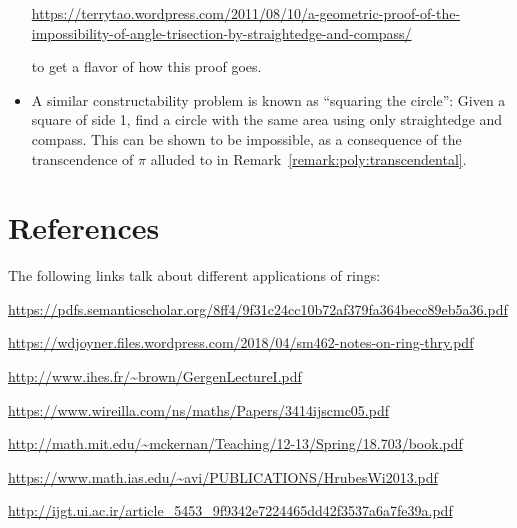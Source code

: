 \begin{itemize}
\noindent
 \footnotesize{\url{https://terrytao.wordpress.com/2011/08/10/a-geometric-proof-of-the-}}\\
 \footnotesize{\url{impossibility-of-angle-trisection-by-straightedge-and-compass/}}

\noindent
 to get a flavor of how this proof goes.
\item
A similar constructability problem is known as ``squaring the circle'':  Given a square of side 1, find a circle with the same area using only straightedge and compass. This can be shown to be impossible, as a consequence of the transcendence of $\pi$ alluded to in Remark~\ref{remark:poly:transcendental}.
\end{itemize}

\section{References}
\label{sec:Rings:References}

The following links talk about different applications of rings:

\noindent \url{https://pdfs.semanticscholar.org/8ff4/9f31c24cc10b72af379fa364becc89eb5a36.pdf}

\noindent \url{https://wdjoyner.files.wordpress.com/2018/04/sm462-notes-on-ring-thry.pdf}

\noindent \url{http://www.ihes.fr/~brown/GergenLectureI.pdf}

\noindent \url{https://www.wireilla.com/ns/maths/Papers/3414ijscmc05.pdf}

\noindent \url{http://math.mit.edu/~mckernan/Teaching/12-13/Spring/18.703/book.pdf}

\noindent \url{https://www.math.ias.edu/~avi/PUBLICATIONS/HrubesWi2013.pdf}

\noindent \url{http://ijgt.ui.ac.ir/article_5453_9f9342e7224465dd42f3537a6a7fe39a.pdf}





